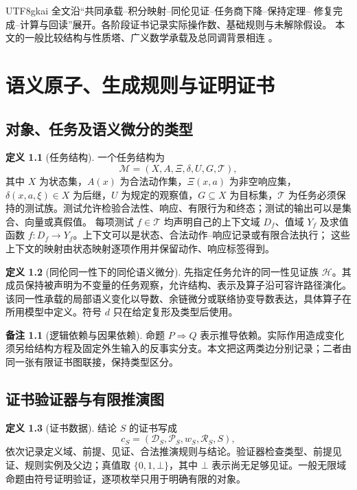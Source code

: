 \documentclass[12pt]{report}
\theoremstyle{definition}
\newtheorem{definition}{定义}[chapter]
\newtheorem{remark}{备注}[chapter]
\begin{document}
\begin{CJK*}{UTF8}{gkai}
全文沿“共同承载--积分映射--同伦见证--任务商下降--保持定理--
修复完成--计算与回读”展开。各阶段证书记录实际操作数、基础规则与未解除假设。
本文的一般比较结构与性质塔、广义数学承载及总同调背景相连
\cite{propertytower,discrete,layers,pure,total}。

\tableofcontents
\clearpage
{}

\chapter{语义原子、生成规则与证明证书}
\label{sec:logic}
\section{对象、任务及语义微分的类型}
\begin{definition}[任务结构]
一个任务结构为
\[
\mathcal M=(X,A,\Xi,\delta,U,G,\mathcal T),
\]
其中 \(X\) 为状态集，\(A(x)\) 为合法动作集，\(\Xi(x,a)\) 为非空响应集，\(\delta(x,a,\xi)\in X\) 为后继，\(U\) 为规定的观察值，\(G\subseteq X\) 为目标集，\(\mathcal T\) 为任务必须保持的测试族。测试允许检验合法性、响应、有限行为和终态；测试的输出可以是集合、向量或真假值。
每项测试 \(f\in\mathcal T\) 均声明自己的上下文域 \(D_f\)、值域 \(Y_f\) 及求值函数
\(f:D_f\to Y_f\)。上下文可以是状态、合法动作--响应记录或有限合法执行；
这些上下文的映射由状态映射逐项作用并保留动作、响应标签得到。
\end{definition}

\begin{definition}[同伦同一性下的同伦语义微分]
先指定任务允许的同一性见证族 \(\mathcal H\)。其成员保持被声明为不变量的任务观察，允许结构、表示及算子沿可容许路径演化。该同一性承载的局部语义变化以导数、余链微分或联络协变导数表达，具体算子在所用模型中定义。符号 \(d\) 只在给定复形及类型后使用。
\end{definition}

\begin{remark}[逻辑依赖与因果依赖]
命题 \(P\Rightarrow Q\) 表示推导依赖。实际作用造成变化须另给结构方程及固定外生输入的反事实分支。本文把这两类边分别记录；二者由同一张有限证书图联接，保持类型区分。
\end{remark}

\section{证书验证器与有限推演图}
\begin{definition}[证书数据]
结论 \(S\) 的证书写成
\[
c_S=(\mathcal D_S,\mathcal P_S,w_S,\mathcal R_S,S),
\]
依次记录定义域、前提、见证、合法推演规则与结论。验证器检查类型、前提见证、规则实例及父边；真值取 \(\{0,1,\bot\}\)，其中 \(\bot\) 表示尚无足够见证。一般无限域命题由符号证明验证，逐项枚举只用于明确有限的对象。
\end{definition}


\end{CJK*}
\end{document}
